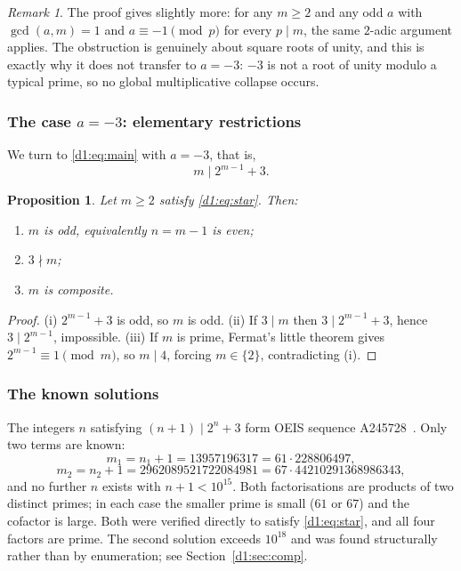 \documentclass[a4paper]{article}
\theoremstyle{plain}
\newtheorem{proposition}{Proposition}[subsection]
\theoremstyle{definition}
\theoremstyle{remark}
\newtheorem{remark}{Remark}[subsection]
\begin{document}
\begin{remark}\label{d1:rem:roots}
The proof gives slightly more: for any $m\ge 2$ and any odd $a$ with $\gcd(a,m)=1$ and
$a\equiv-1\pmod{p}$ for every $p\mid m$, the same $2$-adic argument applies. The obstruction is
genuinely about square roots of unity, and this is exactly why it does not transfer to $a=-3$:
$-3$ is not a root of unity modulo a typical prime, so no global multiplicative collapse occurs.
\end{remark}

\subsubsection{The case \texorpdfstring{$a=-3$}{a=-3}: elementary restrictions}

We turn to \eqref{d1:eq:main} with $a=-3$, that is,
\begin{equation}\label{d1:eq:star}\tag{$\star$}
m\mid 2^{m-1}+3.
\end{equation}

\begin{proposition}\label{d1:prop:elem}
Let $m\ge 2$ satisfy \eqref{d1:eq:star}. Then:
\begin{enumerate}[label=\textup{(\roman*)}]
\item $m$ is odd, equivalently $n=m-1$ is even;
\item $3\nmid m$;
\item $m$ is composite.
\end{enumerate}
\end{proposition}

\begin{proof}
(i) $2^{m-1}+3$ is odd, so $m$ is odd. (ii) If $3\mid m$ then $3\mid 2^{m-1}+3$, hence
$3\mid 2^{m-1}$, impossible. (iii) If $m$ is prime, Fermat's little theorem gives
$2^{m-1}\equiv 1\pmod m$, so $m\mid 4$, forcing $m\in\{2\}$, contradicting (i).
\end{proof}

\subsubsection{The known solutions}

The integers $n$ satisfying $(n+1)\mid 2^{n}+3$ form OEIS sequence A245728~\cite{d1:oeis}. Only two
terms are known:
\[
m_{1}=n_{1}+1=13957196317=61\cdot 228806497,
\]
\[
m_{2}=n_{2}+1=2962089521722084981=67\cdot 44210291368986343,
\]
and no further $n$ exists with $n+1<10^{15}$. Both factorisations are products of two distinct
primes; in each case the smaller prime is small ($61$ or $67$) and the cofactor is large. Both
were verified directly to satisfy \eqref{d1:eq:star}, and all four factors are prime. The second
solution exceeds $10^{18}$ and was found structurally rather than by enumeration; see
Section~\ref{d1:sec:comp}.
\end{document}
